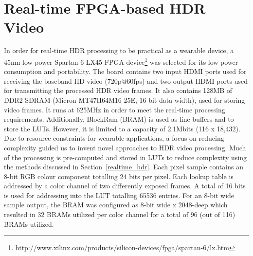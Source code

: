 %
%


\section{Real-time FPGA-based HDR Video}

In order for real-time HDR processing to be practical as a wearable device, a 45nm
low-power Spartan-6 LX45 FPGA
device\footnote{http://www.xilinx.com/products/silicon-devices/fpga/spartan-6/lx.htm}
was selected for its low power consumption and portability.  The board
contains two input HDMI ports used for receiving the baseband HD video
(720p@60fps) and two output HDMI ports used for transmitting the
processed HDR video frames. It also contains 128MB of DDR2 SDRAM
(Micron MT47H64M16-25E, 16-bit data width), used for storing video
frames. It runs at 625MHz in order to meet the real-time processing
requirements. Additionally, BlockRam (BRAM) is used as line buffers
and to store the LUTs. However, it is limited to a capacity of 2.1Mbits
(116 x 18,432).  Due to resource constraints for wearable applications, a focus on reducing
complexity guided us to invent novel approaches to HDR video processing.  Much of
the processing is pre-computed and stored in LUTs to
reduce complexity using the methods discussed in
Section~\ref{realtime_hdr}.  Each pixel sample contains an 8-bit RGB
colour component totalling 24 bits per pixel.  Each lookup table is
addressed by a color channel of two differently exposed frames.  A
total of 16 bits is used for addressing into the LUT totalling
65536 entries.  For an 8-bit wide sample output, the BRAM was configured
as 8-bit wide x 2048-deep which resulted in 32 BRAMs utilized per
color channel for a total of 96 (out of 116) BRAMs utilized.

